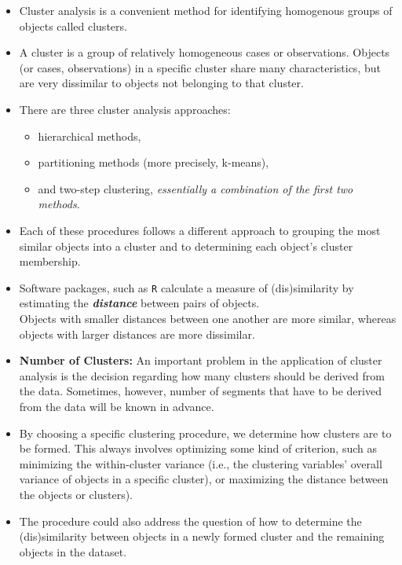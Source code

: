\documentclass[RCluster.tex]{subfiles}
\begin{document}




\begin{itemize}
\item Cluster analysis is a convenient method for identifying homogenous groups of
objects called clusters. 
\item A cluster is a group of relatively homogeneous cases or observations. Objects (or cases, observations) in a specific cluster share
many characteristics, but are very dissimilar to objects not belonging to that cluster.
\item  There are three cluster analysis approaches: 
\begin{itemize}
  \item hierarchical methods,
  \item partitioning methods (more precisely, k-means), 
  \item and two-step clustering,
\textit{essentially a combination of the first two methods.}
\end{itemize}
\item Each of these procedures
follows a different approach to grouping the most similar objects into a cluster and
to determining each object’s cluster membership. 
\item Software packages, such as \texttt{R} calculate a measure
of (dis)similarity by estimating the \textbf{\textit{distance}} between pairs of objects. \\ Objects with
smaller distances between one another are more similar, whereas objects with larger
distances are more dissimilar.
\item \textbf{Number of Clusters:} An important problem in the application of cluster analysis is the decision
regarding how many clusters should be derived from the data. 
Sometimes, however,
number of segments that have to be derived from the data will be known in advance.
\item
By choosing a specific clustering procedure, we determine how clusters are to be
formed. This always involves optimizing some kind of criterion, such as minimizing
the within-cluster variance (i.e., the clustering variables’ overall variance of
objects in a specific cluster), or maximizing the distance between the objects or
clusters). 
\item The procedure could also address the question of how to determine the
(dis)similarity between objects in a newly formed cluster and the remaining objects
in the dataset.
\end{itemize}
\newpage
\end{document}
